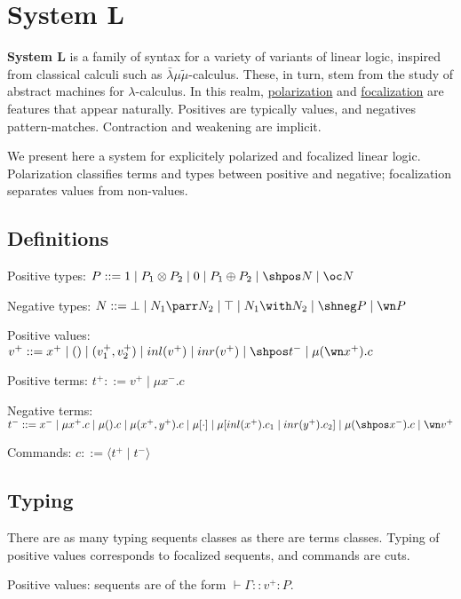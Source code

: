 \section{System L}\label{system-l}

\textbf{System L} is a family of syntax for a variety of variants of
linear logic, inspired from classical calculi such as
\(\bar\lambda\mu\tilde\mu\)-calculus. These, in turn, stem from the
study of abstract machines for \(\lambda\)-calculus. In this realm,
\href{Polarized_linear_logic}{polarization} and \url{focalization} are
features that appear naturally. Positives are typically values, and
negatives pattern-matches. Contraction and weakening are implicit.

We present here a system for explicitely polarized and focalized linear
logic. Polarization classifies terms and types between positive and
negative; focalization separates values from non-values.

\subsection{Definitions}\label{definitions}

Positive types:
\(P ::= 1 \mid P_1 \otimes P_2 \mid 0 \mid P_1 \oplus P_2 \mid \shpos N \mid \oc N\)

Negative types:
\(N ::= \bot \mid N_1 \parr N_2 \mid \top \mid N_1 \with N_2 \mid \shneg P \mid \wn P\)

Positive values:
\(v^+ ::= x^+ \mid () \mid (v_1^+, v_2^+) \mid inl(v^+) \mid inr(v^+) \mid \shpos t^- \mid \mu(\wn x^+).c\)

Positive terms: \(t^+ ::= v^+ \mid \mu x^-.c\)

Negative terms:
\(t^- ::= x^- \mid \mu x^+.c \mid \mu().c \mid \mu(x^+, y^+).c \mid \mu [\cdot] \mid \mu[inl(x^+).c_1 \mid inr(y^+).c_2] \mid \mu(\shpos x^-).c \mid \wn v^+\)

Commands: \(c ::= \langle t^+ \mid t^- \rangle\)

\subsection{Typing}\label{typing}

There are as many typing sequents classes as there are terms classes.
Typing of positive values corresponds to focalized sequents, and
commands are cuts.

Positive values: sequents are of the form \(\vdash \Gamma :: v^+ : P\).


